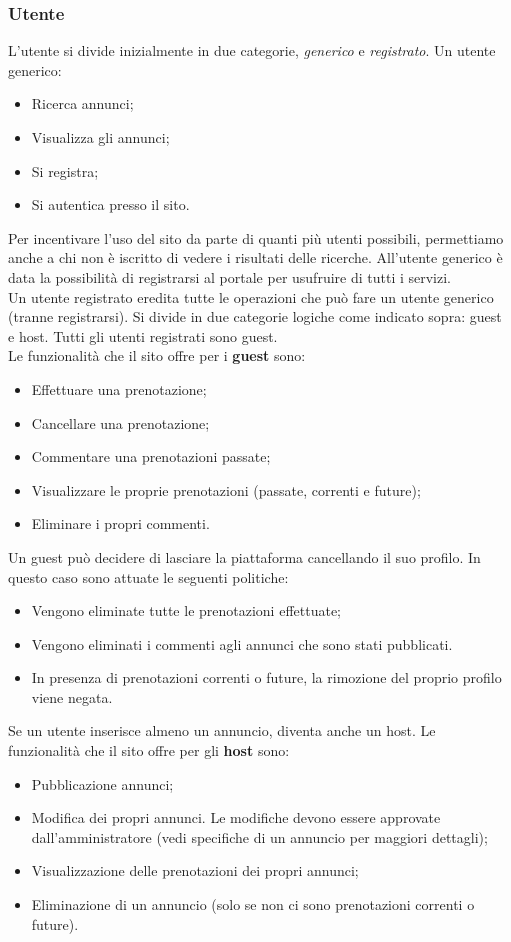 \documentclass[1_relazione.tex]{subfiles}
\begin{document}
\subsubsection{Utente} 
L'utente si divide inizialmente in due categorie, \textit{generico} e \textit{registrato}. Un utente generico:
\begin{itemize}
\item Ricerca annunci;
\item Visualizza gli annunci;
\item Si registra;
 \item Si autentica presso il sito.
\end{itemize}
Per incentivare l'uso del sito da parte di quanti pi\`{u} utenti possibili, permettiamo anche a chi non \`{e} iscritto di vedere i risultati delle ricerche. All'utente generico \`{e} data la possibilit\`{a} di registrarsi al portale per usufruire di tutti i servizi.  \\
Un utente registrato eredita tutte le operazioni che pu\`{o} fare un utente generico (tranne registrarsi). Si divide in due categorie logiche come indicato sopra: guest e host. Tutti gli utenti registrati sono guest.\\
Le funzionalit\`{a} che il sito offre per i \textbf{guest} sono:
\begin{itemize}
\item Effettuare una prenotazione;
\item Cancellare una prenotazione;
\item Commentare una prenotazioni passate;
\item Visualizzare le proprie prenotazioni (passate, correnti e future);
\item Eliminare i propri commenti.
\end{itemize}
Un guest pu\`{o} decidere di lasciare la piattaforma cancellando il suo profilo. In questo caso sono attuate le seguenti politiche:
\begin{itemize}
\item Vengono eliminate tutte le prenotazioni effettuate;
\item Vengono eliminati i commenti agli annunci che sono stati pubblicati.
\item In presenza di prenotazioni correnti o future, la rimozione del proprio profilo viene negata.
\end{itemize}
Se un utente inserisce almeno un annuncio, diventa anche un host. Le funzionalit\`{a} che il sito offre per gli \textbf{host} sono:
\begin{itemize}
\item Pubblicazione annunci;
\item Modifica dei propri annunci. Le modifiche devono essere approvate dall'amministratore (vedi specifiche di un annuncio per maggiori dettagli);
\item Visualizzazione delle prenotazioni dei propri annunci;
\item Eliminazione di un annuncio (solo se non ci sono prenotazioni correnti o future).
\end{itemize}
\end{document}
